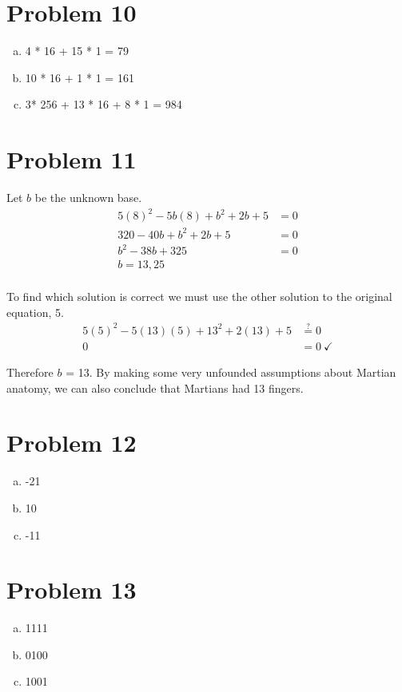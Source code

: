 \documentclass[11pt]{article}
\begin{document}
\section*{Problem 10}
\begin{enumerate}[(a)]
	\item 4 * 16 + 15 * 1 = 79
	\item 10 * 16 + 1 * 1 = 161
	\item 3* 256 + 13 * 16 + 8 * 1 = 984
\end{enumerate}

\section*{Problem 11}
Let $b$ be the unknown base.
\begin{align*}
5(8)^2 - 5b(8) + b^2 + 2b + 5 &= 0 \\
320 - 40b+b^2+2b+5 &= 0 \\
b^2 -38b+ 325 &= 0 \\	
b = 13, 25 \\
\end{align*}

To find which solution is correct we must use the other solution to the original equation, 5.
\begin{align*}
5(5)^2 - 5(13)(5) +13^2+2(13)+5 &\stackrel{?}{=} 0\\
0 &= 0\ \checkmark
\end{align*}

Therefore $b$ = 13. By making some very unfounded assumptions about Martian anatomy, we can also conclude that Martians had 13 fingers.

\section*{Problem 12}
\begin{enumerate}[(a)]
	\item -21
	\item 10
	\item -11
\end{enumerate}

\section*{Problem 13}
\begin{enumerate}[(a)]
	\item 1111
	\item 0100
	\item 1001
\end{enumerate}
\end{document}
